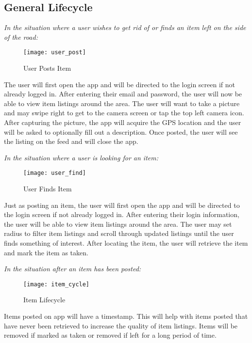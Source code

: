 \documentclass[sigconf]{acmart}
\begin{document}
\subsection{General Lifecycle}

\emph{In the situation where a user wishes to get rid of or finds an item left on the side of the road:} \\ 

\begin{figure}[H]
	\texttt{[image: user\_post]}
	\caption{User Posts Item}
	\label{}
\end{figure}

The user will first open the app and will be directed to the login screen if not already logged in. After entering their email and password, the user will now be able to view item listings around the area. The user will want to take a picture and may swipe right to get to the camera screen or tap the top left camera icon. After capturing the picture, the app will acquire the GPS location and the user will be asked to optionally fill out a description. Once posted, the user will see the listing on the feed and will close the app.

\emph{In the situation where a user is looking for an item:} \\

\begin{figure}[H]
	\texttt{[image: user\_find]}
	\caption{User Finds Item}
	\label{}
\end{figure}

Just as posting an item, the user will first open the app and will be directed to the login screen if not already logged in. After entering their login information, the user will be able to view item listings around the area. The user may set radius to filter item listings and scroll through updated listings until the user finds something of interest. After locating the item, the user will retrieve the item and mark the item as taken.


\emph{In the situation after an item has been posted:}\\

\begin{figure}[H]
	\texttt{[image: item\_cycle]}
	\caption{Item Lifecycle}
	\label{}
\end{figure}

Items posted on app will have a timestamp. This will help with items posted that have never been retrieved to increase the quality of item listings. Items will be removed if marked as taken or removed if left for a long period of time.
\end{document}
